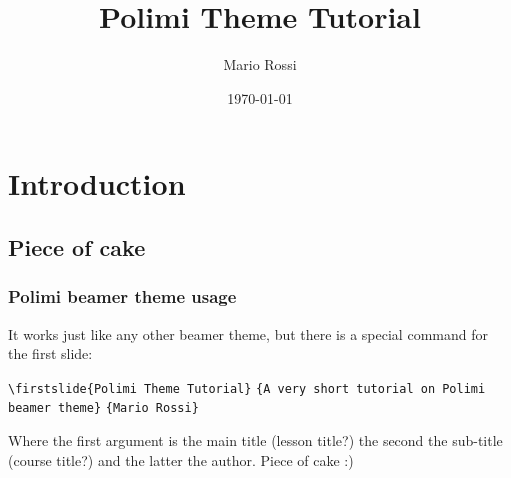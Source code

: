 \documentclass{beamer}
\title{Polimi Theme Tutorial}
\author{Mario Rossi}
\date{\today}
\institute{Polimi}
\begin{document}

\section[Outline]{}

\section{Introduction}
\subsection{Piece of cake}
\begin{frame}[fragile]

  \frametitle{Polimi beamer theme usage}
  
  It works just like any other beamer theme, but there is a special
  command for the first slide:
  \begin{center}
  	\verb+\firstslide{Polimi Theme Tutorial}+
	\verb+{A very short tutorial on Polimi beamer theme}+
	\verb+{Mario Rossi}+
  \end{center}
Where the first argument is the main title (lesson title?) the second 
the sub-title (course title?) and the latter the author. Piece of cake :)
  
  

\end{frame}
\end{document}
